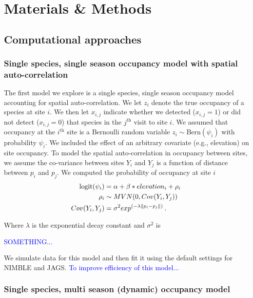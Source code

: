 \documentclass[12pt]{article}
\newcommand{\flagged}[1] {
  \textcolor{blue}{#1}
}
\begin{document}
\section*{Materials \& Methods}
\label{sec:methods}
\subsection*{Computational approaches}

\subsubsection*{Single species, single season occupancy model with
  spatial auto-correlation}
The first model we explore is a single species, single season
occupancy model accounting for spatial auto-correlation. We let
$z_{i}$ denote the true occupancy of a species at site $i$.  We then
let $x_{i,j}$ indicate whether we detected ($x_{i,j}=1$) or did not
detect ($x_{i,j}=0$) that species in the $j^{\mathrm{th}}$ visit to
site $i$.  We assumed that occupancy at the $i^{\mathrm{th}}$ site is
a Bernoulli random variable $z_{i} \sim \mathrm{Bern}(\psi_{i})$ with
probability $\psi_{i}$.  We included the effect of an arbitrary
covariate (e.g., elevation) on site occupancy. To model the spatial
auto-correlation in occupancy between sites, we assume the co-variance
between sites $Y_i$ and $Y_j$ is a function of distance between $p_i$
and $p_j$. We computed the probability of occupancy at site $i$
%
\begin{equation}
  \begin{split}
    \label{eq:spatial}
    \mathrm{logit}(\psi_{i}) &=
    \alpha + \beta*elevation_i + \rho_i\hspace{0.2em}\\
    \rho_i &\sim MVN(0, {Cov}(Y_i,Y_j)) \hspace{0.2em}\\
    {Cov} (Y_i,Y_j) &= \sigma^2exp^{(-\lambda\|p_i-p_j\|)} \hspace{0.2em}.\\
  \end{split}
\end{equation}
%

Where $\lambda$ is the exponential decay constant and $\sigma^2$ is
\flagged{SOMETHING...}

We simulate data for this model and then fit it using the default
settings for NIMBLE and JAGS. \flagged{To improve efficiency of this
  model...}


\subsubsection*{Single species, multi season (dynamic) occupancy
  model}
\label{sec:ssms}
\end{document}
